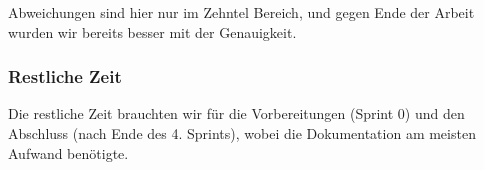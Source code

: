 Abweichungen sind hier nur im Zehntel Bereich, und gegen Ende der Arbeit wurden wir bereits besser mit der Genauigkeit.

\subsubsection{Restliche Zeit}
Die restliche Zeit brauchten wir für die Vorbereitungen (Sprint 0) und den Abschluss (nach Ende des 4. Sprints), wobei die Dokumentation am meisten Aufwand benötigte.